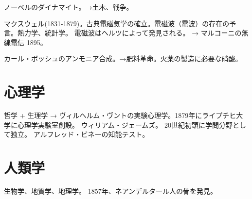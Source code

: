 \documentclass[uplatex,dvipdfmx]{jsarticle}
\begin{document}
ノーベルのダイナマイト。→土木、戦争。

マクスウェル(1831-1879)。古典電磁気学の確立。電磁波（電波）の存在の予言。熱力学、統計学。
電磁波はヘルツによって発見される。 → マルコーニの無線電信 1895。

カール・ボッシュのアンモニア合成。→肥料革命。火薬の製造に必要な硝酸。



\section{心理学}



哲学 + 生理学 →
ヴィルヘルム・ヴントの実験心理学。1879年にライプチヒ大学に心理学実験室創設。
ウィリアム・ジェームズ。
20世紀初頭に学問分野として独立。
アルフレッド・ビネーの知能テスト。

\section{人類学}

生物学、地質学、地理学。
1857年、ネアンデルタール人の骨を発見。





\ifx\mybook\undefined

  

\end{document}
